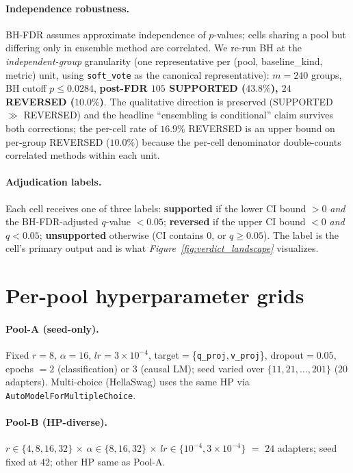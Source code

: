 \documentclass[11pt]{article}
\begin{document}
\paragraph{Independence robustness.} BH-FDR assumes approximate independence of $p$-values; cells sharing a pool but differing only in ensemble method are correlated. We re-run BH at the \emph{independent-group} granularity (one representative per (pool, baseline\_kind, metric) unit, using \texttt{soft\_vote} as the canonical representative): $m{=}240$ groups, BH cutoff $p{\leq}0.0284$, \textbf{post-FDR $105$ SUPPORTED ($43.8\%$), $24$ REVERSED ($10.0\%$)}. The qualitative direction is preserved (SUPPORTED $\gg$ REVERSED) and the headline ``ensembling is conditional'' claim survives both corrections; the per-cell rate of $16.9\%$ REVERSED is an upper bound on per-group REVERSED ($10.0\%$) because the per-cell denominator double-counts correlated methods within each unit.

\paragraph{Adjudication labels.} Each cell receives one of three labels: \textbf{supported} if the lower CI bound $>0$ \emph{and} the BH-FDR-adjusted $q$-value $<0.05$; \textbf{reversed} if the upper CI bound $<0$ \emph{and} $q{<}0.05$; \textbf{unsupported} otherwise (CI contains $0$, or $q{\geq}0.05$). The label is the cell's primary output and is what \emph{Figure~\ref{fig:verdict_landscape}} visualizes.

\section{Per-pool hyperparameter grids}\label{app:hp}
\paragraph{Pool-A (seed-only).} Fixed $r{=}8$, $\alpha{=}16$, $lr{=}3{\times}10^{-4}$, target$=$\{\texttt{q\_proj},\,\texttt{v\_proj}\}, dropout$=0.05$, epochs $=2$ (classification) or $3$ (causal LM); seed varied over $\{11, 21, \ldots, 201\}$ ($20$ adapters). Multi-choice (HellaSwag) uses the same HP via \texttt{AutoModelForMultipleChoice}.

\paragraph{Pool-B (HP-diverse).} $r{\in}\{4, 8, 16, 32\}$ $\times$ $\alpha{\in}\{8, 16, 32\}$ $\times$ $lr{\in}\{10^{-4}, 3{\times}10^{-4}\}$ $=$ $24$ adapters; seed fixed at $42$; other HP same as Pool-A.
\end{document}
